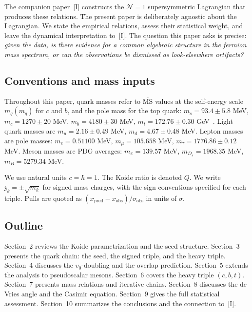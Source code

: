 \documentclass[12pt,a4paper]{article}
\newcommand{\zch}{\mathfrak{z}}
\begin{document}
The companion paper~[I] constructs the $\mathcal{N}=1$ supersymmetric Lagrangian that
produces these relations.  The present paper is deliberately agnostic about the Lagrangian.
We state the empirical relations, assess their statistical weight, and leave the dynamical
interpretation to~[I].
The question this paper asks is precise: \emph{given the data, is there evidence for a common
algebraic structure in the fermion mass spectrum, or can the observations be dismissed as
look-elsewhere artifacts?}

\subsection{Conventions and mass inputs}

Throughout this paper, quark masses refer to $\overline{\text{MS}}$ values at the
self-energy scale $m_q(m_q)$ for $c$ and $b$, and the pole mass for the top quark:
$m_s = 93.4 \pm 5.8$ MeV, $m_c = 1270 \pm 20$ MeV, $m_b = 4180 \pm 30$ MeV,
$m_t = 172.76 \pm 0.30$ GeV~\cite{PDG2024}.  Light quark masses are $m_u = 2.16 \pm 0.49$ MeV,
$m_d = 4.67 \pm 0.48$ MeV.  Lepton masses are pole masses: $m_e = 0.51100$ MeV,
$m_\mu = 105.658$ MeV, $m_\tau = 1776.86 \pm 0.12$ MeV.  Meson masses are PDG
averages: $m_\pi = 139.57$ MeV, $m_{D_s} = 1968.35$ MeV, $m_B = 5279.34$ MeV.

We use natural units $c = \hbar = 1$.  The Koide ratio is denoted $Q$.  We write
$\zch_k = \pm\sqrt{m_k}$ for signed mass charges, with the sign conventions
specified for each triple.  Pulls are quoted as
$(x_{\text{pred}} - x_{\text{obs}})/\sigma_{\text{obs}}$ in units of $\sigma$.

\subsection{Outline}

Section~2 reviews the Koide parametrization and the seed structure.
Section~3 presents the quark chain: the seed, the signed triple, and the heavy triple.
Section~4 discusses the $v_0$-doubling and the overlap prediction.
Section~5 extends the analysis to pseudoscalar mesons.
Section~6 covers the heavy triple $(c,b,t)$.
Section~7 presents mass relations and iterative chains.
Section~8 discusses the de Vries angle and the Casimir equation.
Section~9 gives the full statistical assessment.
Section~10 summarizes the conclusions and the connection to~[I].

\end{document}
